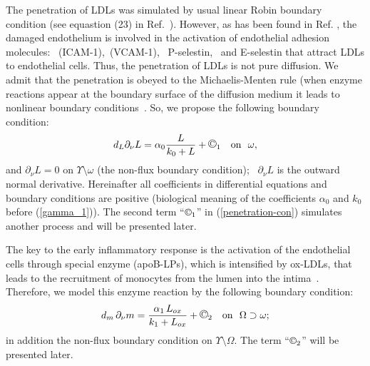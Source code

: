 \documentclass[reqno]{amsart}            %
\numberwithin{equation}{section}
\begin{document}
The penetration of LDLs was simulated by usual linear Robin boundary condition (see equastion (23) in Ref.~\cite{HaoFried-14}).
However, as has been found in Ref. \cite{Fan-Wat}, the damaged endothelium is involved in the activation of endothelial adhesion molecules: \ (ICAM-1),\ (VCAM-1), \ P-selestin, \ and E-selestin that attract LDLs to endothelial cells. Thus, the penetration of LDLs is not pure diffusion.
 We admit that the penetration is obeyed to  the Michaelis-Menten rule (when enzyme reactions appear at the boundary surface of the diffusion medium it leads to nonlinear boundary conditions~\cite{Ross,Pao}. So, we propose the following boundary condition:
\begin{equation}\label{penetration-con}
d_L \partial_{\nu} L =  \alpha_0 \frac{L}{k_0 + L} + {\large {\copyright_1}} \quad \text{on} \ \ \omega,
\end{equation}
and $\partial_{\nu} L = 0 $ on $\Upsilon\setminus \omega$ (the non-flux boundary condition); \ $\partial_{\nu} L$ is the outward normal derivative.
 Hereinafter all coefficients in differential equations and boundary conditions are positive (biological meaning of the coefficients $\alpha_0$ and $k_0$ before  (\ref{gamma_1})).   The second term ``${\copyright_1}$'' in (\ref{penetration-con}) simulates  another process and will be presented later.

\medskip

The key to the early inflammatory response is the activation of the endothelial cells through special enzyme (apoB-LPs), which is intensified by ox-LDLs, that leads to the recruitment of monocytes from the lumen into the intima~\cite{MesLey}. Therefore, we model this enzyme reaction by the following boundary condition:
\begin{equation} \label{bc-2-mono}
d_m \, \partial_{\nu} m = \frac{\alpha_1 \, L_{ox}}{k_1 + L_{ox}} + {\large {\copyright_2}} \quad \text{on} \ \ \Omega \supset \omega;
\end{equation}
in addition the non-flux boundary condition on $\Upsilon\setminus \Omega.$ The term ``${\copyright_2}$'' will be presented later.
\end{document}
